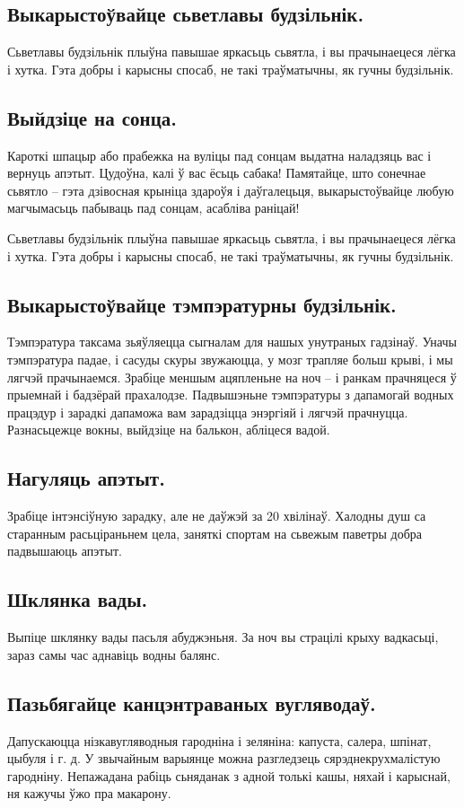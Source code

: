 \subsection{Выкарыстоўвайце сьветлавы будзільнік.}
Сьветлавы будзільнік плыўна павышае яркасьць сьвятла, і вы прачынаецеся лёгка і хутка. Гэта добры і карысны спосаб, не такі траўматычны, як гучны будзільнік.

\subsection{Выйдзіце на сонца.}
Кароткі шпацыр або прабежка на вуліцы пад сонцам выдатна наладзяць вас і вернуць апэтыт. Цудоўна, калі ў вас ёсьць сабака! Памятайце, што сонечнае сьвятло – гэта дзівосная крыніца здароўя і даўгалецьця, выкарыстоўвайце любую магчымасьць пабываць пад сонцам, асабліва раніцай!

Сьветлавы будзільнік плыўна павышае яркасьць сьвятла, і вы прачынаецеся лёгка і хутка. Гэта добры і карысны спосаб, не такі траўматычны, як гучны будзільнік.

\subsection{Выкарыстоўвайце тэмпэратурны будзільнік.}
Тэмпэратура таксама зьяўляецца сыгналам для нашых унутраных гадзінаў. Уначы тэмпэратура падае, і сасуды скуры звужаюцца, у мозг трапляе больш крыві, і мы лягчэй прачынаемся. Зрабіце меншым ацяпленьне на ноч – і ранкам прачняцеся ў прыемнай і бадзёрай прахалодзе. Падвышэньне тэмпэратуры з дапамогай водных працэдур і зарадкі дапаможа вам зарадзіцца энэргіяй і лягчэй прачнуцца. Разнасьцежце вокны, выйдзіце на балькон, абліцеся вадой.

\subsection{Нагуляць апэтыт.}
Зрабіце інтэнсіўную зарадку, але не даўжэй за 20 хвілінаў. Халодны душ са старанным расьціраньнем цела, заняткі спортам на сьвежым паветры добра падвышаюць апэтыт.

\subsection{Шклянка вады.}
Выпіце шклянку вады пасьля абуджэньня. За ноч вы страцілі крыху вадкасьці, зараз самы час аднавіць водны балянс.

\subsection{Пазьбягайце канцэнтраваных вугляводаў.}
Дапускаюцца нізкавугляводныя гародніна і зеляніна: капуста, салера, шпінат, цыбуля і г. д. У звычайным варыянце можна разгледзець сярэднекрухмалістую гародніну. Непажадана рабіць сьняданак з адной толькі кашы, няхай і карыснай, ня кажучы ўжо пра макарону.

